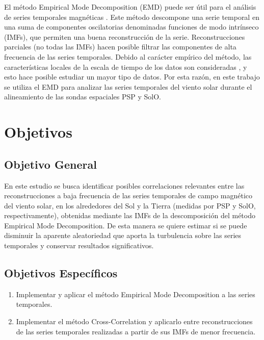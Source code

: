 El método Empirical Mode Decomposition (EMD) puede ser útil para el análisis de series temporales magnéticas \cite{de_michelis_multi-scale_2012, carbone_arbitrary-order_2018, alberti_multifractal_2019, carbone_statistical_2020, carbone_statistical_2021}. Este método descompone una serie temporal en una suma de componentes oscilatorias denominadas funciones de modo intrínseco (IMFs), que permiten una buena reconstrucción de la serie. Reconstrucciones parciales (no todas las IMFs) hacen posible filtrar las componentes de alta frecuencia de las series temporales. Debido al carácter empírico del método, las características locales de la escala de tiempo de los datos son consideradas \cite{huang_empirical_1998}, y esto hace posible estudiar un mayor tipo de datos. Por esta razón, en este trabajo se utiliza el EMD para analizar las series temporales del viento solar durante el alineamiento de las sondas espaciales PSP y SolO. 

\section{Objetivos}

\subsection{Objetivo General}

\noindent En este estudio se busca identificar posibles correlaciones relevantes entre las reconstrucciones a baja frecuencia de las series temporales de campo magnético del viento solar, en los alrededores del Sol y la Tierra (medidas por PSP y SolO, respectivamente), obtenidas mediante las IMFs de la descomposición del método Empirical Mode Decomposition. De esta manera se quiere estimar si se puede disminuir la aparente aleatoriedad que aporta la turbulencia sobre las series temporales y conservar resultados significativos.


\subsection{Objetivos Específicos}

\begin{enumerate}
    \item Implementar y aplicar el método Empirical Mode Decomposition a las series temporales.
    \item Implementar el método Cross-Correlation y aplicarlo entre reconstrucciones de las series temporales realizadas a partir de sus IMFs de menor frecuencia.  
\end{enumerate}

